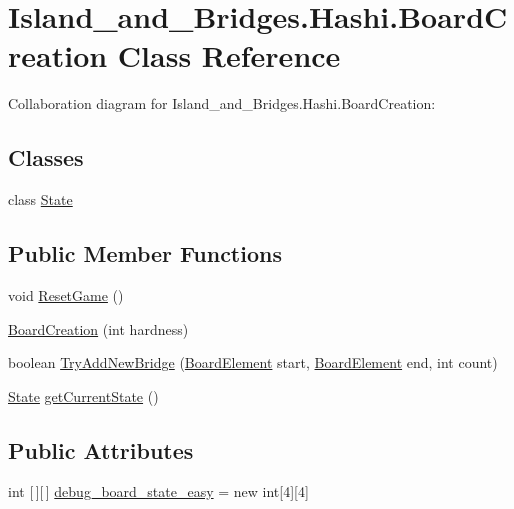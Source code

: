 \hypertarget{class_island__and___bridges_1_1_hashi_1_1_board_creation}{}\section{Island\+\_\+and\+\_\+\+Bridges.\+Hashi.\+Board\+Creation Class Reference}
\label{class_island__and___bridges_1_1_hashi_1_1_board_creation}


Collaboration diagram for Island\+\_\+and\+\_\+\+Bridges.\+Hashi.\+Board\+Creation\+:
\subsection*{Classes}
\begin{DoxyCompactItemize}
\item 
class \mbox{\hyperlink{class_island__and___bridges_1_1_hashi_1_1_board_creation_1_1_state}{State}}
\end{DoxyCompactItemize}
\subsection*{Public Member Functions}
\begin{DoxyCompactItemize}
\item 
void \mbox{\hyperlink{class_island__and___bridges_1_1_hashi_1_1_board_creation_a4517f61489e5511d4201653176ed66ac}{Reset\+Game}} ()
\item 
\mbox{\hyperlink{class_island__and___bridges_1_1_hashi_1_1_board_creation_a16cc074e16325ededb3e7b8c9d49f612}{Board\+Creation}} (int hardness)
\item 
boolean \mbox{\hyperlink{class_island__and___bridges_1_1_hashi_1_1_board_creation_ab8c1a9fe93d59d2aaa70519a17a3870a}{Try\+Add\+New\+Bridge}} (\mbox{\hyperlink{class_island__and___bridges_1_1_hashi_1_1_board_element}{Board\+Element}} start, \mbox{\hyperlink{class_island__and___bridges_1_1_hashi_1_1_board_element}{Board\+Element}} end, int count)
\item 
\mbox{\hyperlink{class_island__and___bridges_1_1_hashi_1_1_board_creation_1_1_state}{State}} \mbox{\hyperlink{class_island__and___bridges_1_1_hashi_1_1_board_creation_a976ae525617a23880c54d0f588197b48}{get\+Current\+State}} ()
\end{DoxyCompactItemize}
\subsection*{Public Attributes}
\begin{DoxyCompactItemize}
\item 
int \mbox{[}$\,$\mbox{]}\mbox{[}$\,$\mbox{]} \mbox{\hyperlink{class_island__and___bridges_1_1_hashi_1_1_board_creation_a252f23ea0e22bb7a7e850d11f44165c3}{debug\+\_\+board\+\_\+state\+\_\+easy}} = new int\mbox{[}4\mbox{]}\mbox{[}4\mbox{]}
\end{DoxyCompactItemize}
